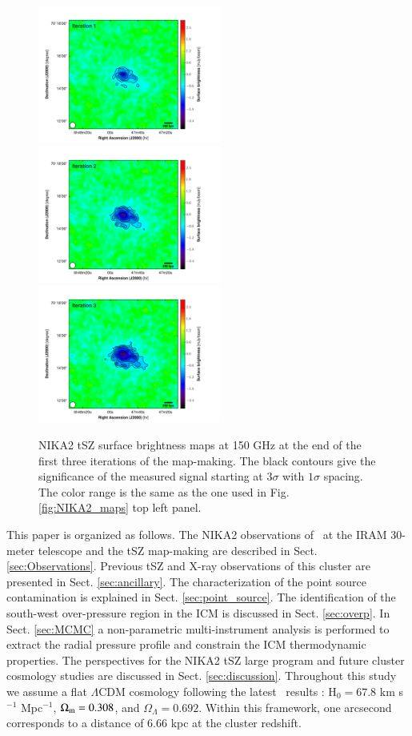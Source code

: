 \documentclass[traditabstract]{aa}
\begin{document}
\begin{figure}[h!]
\centering
\includegraphics[height=4.5cm]{NIKA2_PSZ2G1441_2mm_iterative_iter1.pdf}
\includegraphics[height=4.5cm]{NIKA2_PSZ2G1441_2mm_iterative_iter2.pdf}
\includegraphics[height=4.5cm]{NIKA2_PSZ2G1441_2mm_iterative_iter3.pdf}
\caption{{\footnotesize NIKA2 tSZ surface brightness maps at 150 GHz at the end of the first three iterations of the map-making. The black contours give the significance of the measured signal starting at $3\sigma$ with $1\sigma$ spacing. The color range is the same as the one used in Fig. \ref{fig:NIKA2_maps} top left panel.}}
\label{fig:NIKA2_maps_iterative}
\end{figure}
\indent This paper is organized as follows. The NIKA2 observations of \psz\ at the IRAM 30-meter telescope and the tSZ map-making are described in Sect. \ref{sec:Observations}. Previous tSZ and X-ray observations of this cluster are presented in Sect. \ref{sec:ancillary}. The characterization of the point source contamination is explained in Sect. \ref{sec:point_source}. The identification of the south-west over-pressure region in the ICM is discussed in Sect. \ref{sec:overp}. In Sect. \ref{sec:MCMC} a non-parametric multi-instrument analysis is performed to extract the radial pressure profile and constrain the ICM thermodynamic properties. The perspectives for the NIKA2 tSZ large program and future cluster cosmology studies are discussed in Sect. \ref{sec:discussion}. Throughout this study we assume a flat $\Lambda$CDM cosmology following the latest \planck\ results \citep{pla16b}: H$_0 = 67.8$ km s$^{-1}$ Mpc$^{-1}$, $\Omega_{\rm m} = 0.308$, and $\Omega_\Lambda = 0.692$. Within this framework, one arcsecond corresponds to a distance of 6.66 kpc at the cluster redshift.
\end{document}
